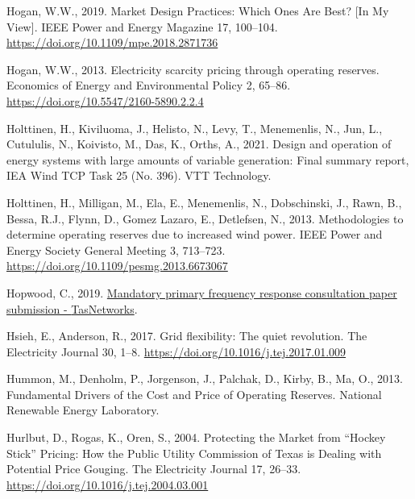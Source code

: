 \documentclass[12pt,a4paper,]{report}
\newlength{\cslhangindent}
\newenvironment{CSLReferences}[2] %
 {%
  \setlength{\parindent}{0pt}
  \ifodd #1 \everypar{\setlength{\hangindent}{\cslhangindent}}\ignorespaces\fi
  \ifnum #2 > 0
  \setlength{\parskip}{#2\baselineskip}
  \fi
 }%
 {}
\begin{document}
\begin{CSLReferences}{1}{0}
\leavevmode{}%
Hogan, W.W., 2019. Market {Design Practices}: {Which Ones Are Best}?
{[}{In My View}{]}. IEEE Power and Energy Magazine 17, 100--104.
\url{https://doi.org/10.1109/mpe.2018.2871736}

\leavevmode{}%
Hogan, W.W., 2013. Electricity scarcity pricing through operating
reserves. Economics of Energy and Environmental Policy 2, 65--86.
\url{https://doi.org/10.5547/2160-5890.2.2.4}

\leavevmode{}%
Holttinen, H., Kiviluoma, J., Helisto, N., Levy, T., Menemenlis, N.,
Jun, L., Cutululis, N., Koivisto, M., Das, K., Orths, A., 2021. Design
and operation of energy systems with large amounts of variable
generation: {Final} summary report, {IEA Wind TCP Task} 25 (No. 396).
{VTT Technology}.

\leavevmode{}%
Holttinen, H., Milligan, M., Ela, E., Menemenlis, N., Dobschinski, J.,
Rawn, B., Bessa, R.J., Flynn, D., Gomez Lazaro, E., Detlefsen, N., 2013.
Methodologies to determine operating reserves due to increased wind
power. IEEE Power and Energy Society General Meeting 3, 713--723.
\url{https://doi.org/10.1109/pesmg.2013.6673067}

\leavevmode{}%
Hopwood, C., 2019.
\href{https://www.aemc.gov.au/sites/default/files/2019-11/Rule\%20Change\%20SubmissionERC0274\%20-\%20TasNetworks\%20-\%2020191031.PDF}{Mandatory
primary frequency response consultation paper submission -
{TasNetworks}}.

\leavevmode{}%
Hsieh, E., Anderson, R., 2017. Grid flexibility: {The} quiet revolution.
The Electricity Journal 30, 1--8.
\url{https://doi.org/10.1016/j.tej.2017.01.009}

\leavevmode{}%
Hummon, M., Denholm, P., Jorgenson, J., Palchak, D., Kirby, B., Ma, O.,
2013. Fundamental {Drivers} of the {Cost} and {Price} of {Operating
Reserves}. {National Renewable Energy Laboratory}.

\leavevmode{}%
Hurlbut, D., Rogas, K., Oren, S., 2004. Protecting the {Market} from
{``{Hockey Stick}''} {Pricing}: {How} the {Public Utility Commission} of
{Texas} is {Dealing} with {Potential Price Gouging}. The Electricity
Journal 17, 26--33. \url{https://doi.org/10.1016/j.tej.2004.03.001}


\end{CSLReferences}
\end{document}

